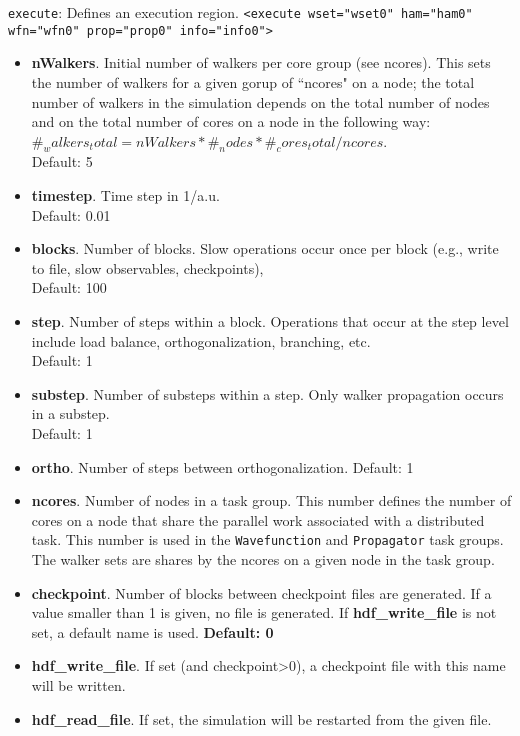 \texttt{execute}: Defines an execution region. 
\texttt{<execute wset="wset0" ham="ham0" wfn="wfn0" prop="prop0" info="info0">}
\begin{itemize}
\item \textbf{nWalkers}. Initial number of walkers per core group (see ncores). This sets the number of walkers for a given gorup of ``ncores" on a node; the total number of walkers in the simulation depends on the total number of nodes and on the total number of cores on a node in the following way: $ \#_walkers_total = nWalkers * \#_nodes * \#_cores_total / ncores $. \\ 
    Default: 5
\item \textbf{timestep}. Time step in 1/a.u. \\
    Default: 0.01
\item \textbf{blocks}. Number of blocks. Slow operations occur once per block (e.g., write to file, slow observables, checkpoints), \\
    Default: 100
\item \textbf{step}. Number of steps within a block. Operations that occur at the step level include load balance, orthogonalization, branching, etc. \\
    Default: 1
\item \textbf{substep}. Number of substeps within a step. Only walker propagation occurs in a substep. \\
    Default: 1
\item \textbf{ortho}. Number of steps between orthogonalization.
    Default: 1
\item \textbf{ncores}. Number of nodes in a task group. This number defines the number of cores on a node that share the parallel work associated with a distributed task. This number is used in the \texttt{Wavefunction} and \texttt{Propagator} task groups. The walker sets are shares by the ncores on a given node in the task group.
\item \textbf{checkpoint}. Number of blocks between checkpoint files are generated. If a value smaller than 1 is given, no file is generated. If \textbf{hdf\_write\_file} is not set, a default name is used. \textbf{Default: 0} 
\item \textbf{hdf\_write\_file}. If set (and checkpoint>0), a checkpoint file with this name will be written.
\item \textbf{hdf\_read\_file}. If set, the simulation will be restarted from the given file.\\
\end{itemize}

